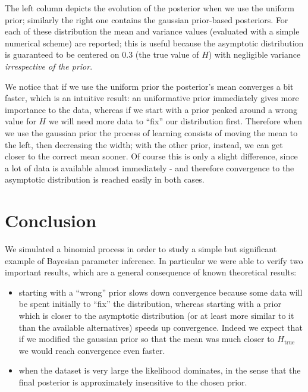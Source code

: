 \documentclass[
]{article}
\begin{document}
The left column depicts the evolution of the posterior when we use the
uniform prior; similarly the right one contains the gaussian prior-based
posteriors. For each of these distribution the mean and variance values
(evaluated with a simple numerical scheme) are reported; this is useful
because the asymptotic distribution is guaranteed to be centered on 0.3
(the true value of \(H\)) with negligible variance \emph{irrespective of
the prior}.

We notice that if we use the uniform prior the posterior's mean
converges a bit faster, which is an intuitive result: an uniformative
prior immediately gives more importance to the data, whereas if we start
with a prior peaked around a wrong value for \(H\) we will need more
data to ``fix'' our distribution first. Therefore when we use the
gaussian prior the process of learning consists of moving the mean to
the left, then decreasing the width; with the other prior, instead, we
can get closer to the correct mean sooner. Of course this is only a
slight difference, since a lot of data is available almost immediately -
and therefore convergence to the asymptotic distribution is reached
easily in both cases.

\hypertarget{conclusion}{%
\section{Conclusion}\label{conclusion}}

We simulated a binomial process in order to study a simple but
significant example of Bayesian parameter inference. In particular we
were able to verify two important results, which are a general
consequence of known theoretical results:

\begin{itemize}
\item
  starting with a ``wrong'' prior slows down convergence because some
  data will be spent initially to ``fix'' the distribution, whereas
  starting with a prior which is closer to the asymptotic distribution
  (or at least more similar to it than the available alternatives)
  speeds up convergence. Indeed we expect that if we modified the
  gaussian prior so that the mean was much closer to \(H_{\text{true}}\)
  we would reach convergence even faster.
\item
  when the dataset is very large the likelihood dominates, in the sense
  that the final posterior is approximately insensitive to the chosen
  prior.
\end{itemize}
\end{document}
